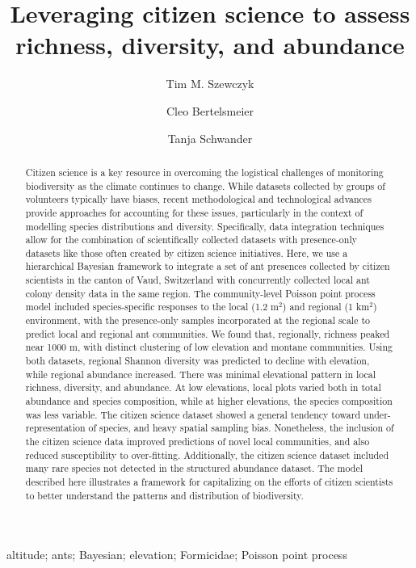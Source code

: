 \documentclass[preprint,final,times,12pt,3p]{elsarticle}
\begin{document}
\begin{frontmatter}

\title{Leveraging citizen science to assess richness, diversity, and abundance}

\author[DEE]{Tim M. Szewczyk}
\author[DEE]{Cleo Bertelsmeier}
\author[DEE]{Tanja Schwander}

\address[DEE]{Department of Ecology and Evolution, University of Lausanne}


\begin{abstract}
Citizen science is a key resource in overcoming the logistical challenges of monitoring biodiversity as the climate continues to change. While datasets collected by groups of volunteers typically have biases, recent methodological and technological advances provide approaches for accounting for these issues, particularly in the context of modelling species distributions and diversity. Specifically, data integration techniques allow for the combination of scientifically collected datasets with presence-only datasets like those often created by citizen science initiatives. Here, we use a hierarchical Bayesian framework to integrate a set of ant presences collected by citizen scientists in the canton of Vaud, Switzerland with concurrently collected local ant colony density data in the same region. The community-level Poisson point process model included species-specific responses to the local (1.2 m$^2$) and regional (1 km$^2$) environment, with the presence-only samples incorporated at the regional scale to predict local and regional ant communities. We found that, regionally, richness peaked near 1000 m, with distinct clustering of low elevation and montane communities. Using both datasets, regional Shannon diversity was predicted to decline with elevation, while regional abundance increased. There was minimal elevational pattern in local richness, diversity, and abundance. At low elevations, local plots varied both in total abundance and species composition, while at higher elevations, the species composition was less variable. The citizen science dataset showed a general tendency toward under-representation of species, and heavy spatial sampling bias. Nonetheless, the inclusion of the citizen science data improved predictions of novel local communities, and also reduced susceptibility to over-fitting. Additionally, the citizen science dataset included many rare species not detected in the structured abundance dataset. The model described here illustrates a framework for capitalizing on the efforts of citizen scientists to better understand the patterns and distribution of biodiversity.
\end{abstract}

\begin{keyword}
altitude; ants; Bayesian; elevation; Formicidae; Poisson point process
\end{keyword}

\end{frontmatter}
\linenumbers
\end{document}
